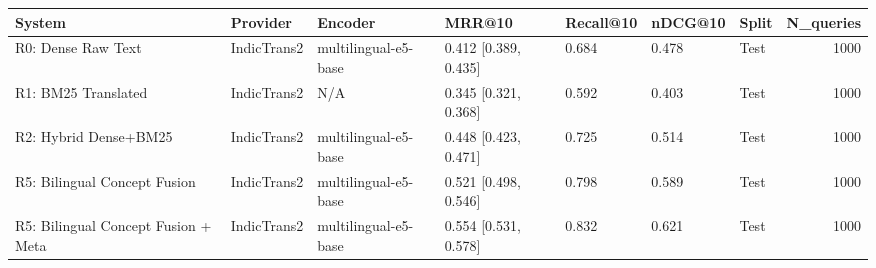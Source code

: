 \begin{tabular}{lllllllr}
\toprule
System & Provider & Encoder & MRR@10 & Recall@10 & nDCG@10 & Split & N_queries \\
\midrule
R0: Dense Raw Text & IndicTrans2 & multilingual-e5-base & 0.412 [0.389, 0.435] & 0.684 & 0.478 & Test & 1000 \\
R1: BM25 Translated & IndicTrans2 & N/A & 0.345 [0.321, 0.368] & 0.592 & 0.403 & Test & 1000 \\
R2: Hybrid Dense+BM25 & IndicTrans2 & multilingual-e5-base & 0.448 [0.423, 0.471] & 0.725 & 0.514 & Test & 1000 \\
R5: Bilingual Concept Fusion & IndicTrans2 & multilingual-e5-base & 0.521 [0.498, 0.546] & 0.798 & 0.589 & Test & 1000 \\
R5: Bilingual Concept Fusion + Meta & IndicTrans2 & multilingual-e5-base & 0.554 [0.531, 0.578] & 0.832 & 0.621 & Test & 1000 \\
\bottomrule
\end{tabular}
